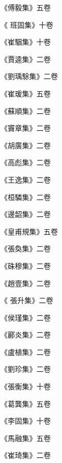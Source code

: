 \begin{pinyinscope}
 《傅毅集》五卷



 《
 班固集》十卷



 《崔駰集》十卷



 《賈逵集》二卷



 《劉瑀駼集》二卷



 《崔瑗集》五卷



 《蘇順集》二卷



 《竇章集》二卷



 《胡廣集》二卷



 《高彪集》二卷



 《王逸集》二卷



 《桓驎集》二卷



 《邊韶集》二卷



 《皇甫規集》五卷



 《張奐集》二卷



 《硃穆集》二卷



 《趙壹集》二卷



 《
 張升集》二卷



 《侯瑾集》二卷



 《酈炎集》二卷



 《盧植集》二卷



 《劉珍集》二卷



 《張衡集》十卷



 《葛龔集》五卷



 《李固集》十卷



 《馬融集》五卷



 《崔琦集》二卷




\end{pinyinscope}
